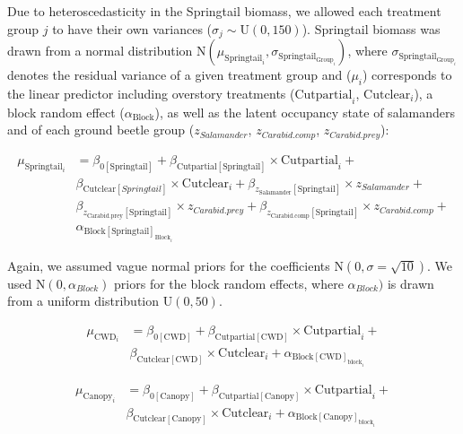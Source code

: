 Due to heteroscedasticity in the Springtail biomass, we allowed each treatment group $j$ to have their own variances ($\sigma_j \sim \text{U}(0,150)$). 
Springtail biomass was drawn from a normal distribution $\text{N} (\mu_{\text{Springtail}_i}, \sigma_{\text{Springtail}_{\text{Group}_i}})$, where $\sigma_{\text{Springtail}_{\text{Group}_i}}$ denotes the 
residual variance of a given treatment group and ($\mu_{i}$) corresponds to the linear predictor including overstory treatments ($\text{Cutpartial}_i$, $\text{Cutclear}_i$), 
a block random effect ($\alpha_{\text{Block}}$), as well as the latent occupancy state of salamanders and of each ground beetle group 
($z_{Salamander}$, $z_{Carabid.comp}$, $z_{Carabid.prey}$):


\begin{align}
  \mu_{\text{Springtail}_i} &= \beta_{0[\text{Springtail}]} + \beta_{\text{Cutpartial}[\text{Springtail}]} \times \text{Cutpartial}_i + \nonumber\\
  &\beta_{\text{Cutclear}[Springtail]} \times \text{Cutclear}_i + \beta_{z_{\text{Salamander}}[\text{Springtail}]} \times z_{Salamander} +  \nonumber\\
  &\beta_{z_{\text{Carabid.prey}}[\text{Springtail}]} \times z_{Carabid.prey} + \beta_{z_{\text{Carabid.comp}}[\text{Springtail}]} \times z_{Carabid.comp} + \nonumber\\
  &\alpha_{\text{Block}[\text{Springtail}]_{\text{Block}_i}} \nonumber
\end{align}


Again, we assumed vague normal priors for the coefficients $\text{N}(0, \sigma = \sqrt{10})$. 
We used $\text{N}(0, \alpha_{Block})$ priors for the block random effects, where $\alpha_{Block})$ is drawn from a uniform distribution $\text{U}(0, 50)$. 


\begin{align}
  \mu_{\text{CWD}_i} &= \beta_{0[\text{CWD}]} + \beta_{\text{Cutpartial}[\text{CWD}]} \times \text{Cutpartial}_{i} + \nonumber\\
  & \beta_{\text{Cutclear}[\text{CWD}]} \times \text{Cutclear}_{i} + \alpha_{\text{Block}[\text{CWD}]_{\text{block}_i}} 
\end{align}

\begin{align}
  \mu_{\text{Canopy}_i} &= \beta_{0[\text{Canopy}]} + \beta_{\text{Cutpartial}[\text{Canopy}]} \times \text{Cutpartial}_{i} + \nonumber \\
  & \beta_{\text{Cutclear}[\text{Canopy}]} \times \text{Cutclear}_{i} + \alpha_{\text{Block}[\text{Canopy}]_{\text{block}_i}} \nonumber
\end{align}

